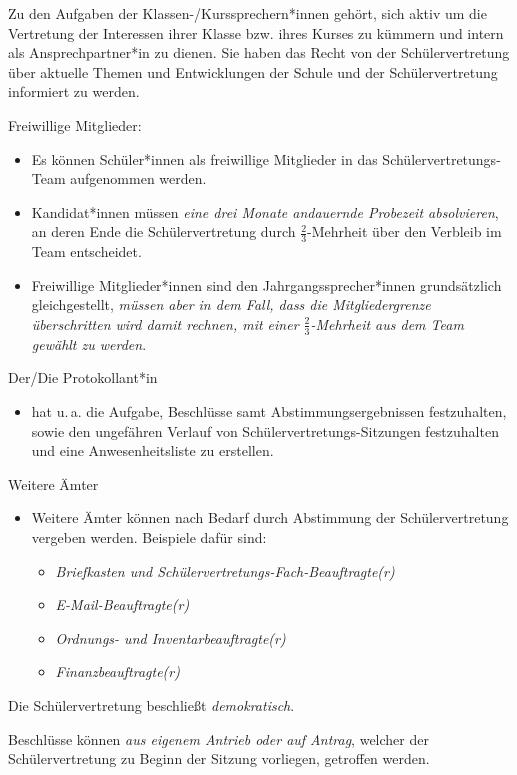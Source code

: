 \documentclass[10pt,a4paper,oneside,parskip=half]{scrartcl}
\begin{document}
\begin{contract}
Zu den Aufgaben der Klassen-/Kurssprechern*innen gehört, sich aktiv um die Vertretung der Interessen ihrer Klasse bzw. ihres Kurses zu kümmern und intern als Ansprechpartner*in zu dienen. Sie haben das Recht von der Schülervertretung über aktuelle Themen und Entwicklungen der Schule und der Schülervertretung informiert zu werden.

Freiwillige Mitglieder:
\begin{itemize}
\item Es können Schüler*innen als freiwillige Mitglieder in das Schülervertretungs-Team aufgenommen werden.
\item Kandidat*innen müssen \emph{eine drei Monate andauernde Probezeit absolvieren}, an deren Ende die Schülervertretung durch $\frac{2}{3}$-Mehrheit über den 
Verbleib im Team entscheidet.
\item Freiwillige Mitglieder*innen sind den Jahrgangssprecher*innen grundsätzlich gleichgestellt, \emph{müssen aber in dem Fall, dass die Mitgliedergrenze überschritten wird damit rechnen, mit einer $\frac{2}{3}$-Mehrheit aus dem Team gewählt zu werden}.
\end{itemize}

Der/Die Protokollant*in
\begin{itemize}
\item hat u.\,a. die Aufgabe, Beschlüsse samt Abstimmungsergebnissen festzuhalten, sowie den ungefähren Verlauf von Schülervertretungs-Sitzungen festzuhalten und eine Anwesenheitsliste zu erstellen.
\end{itemize}

Weitere Ämter
\begin{itemize}
\item Weitere Ämter können nach Bedarf durch Abstimmung der Schülervertretung vergeben werden. Beispiele dafür sind:
\begin{itemize}
\item \emph{Briefkasten und Schülervertretungs-Fach-Beauftragte(r)}
\item \emph{E-Mail-Beauftragte(r)}
\item \emph{Ordnungs- und Inventarbeauftragte(r)}
\item \emph{Finanzbeauftragte(r)}
\end{itemize}
\end{itemize}

Die Schülervertretung beschließt \emph{demokratisch}.

Beschlüsse können \emph{aus eigenem Antrieb oder auf Antrag}, welcher der Schülervertretung zu Beginn der Sitzung vorliegen, getroffen werden.


\end{contract}
\end{document}
